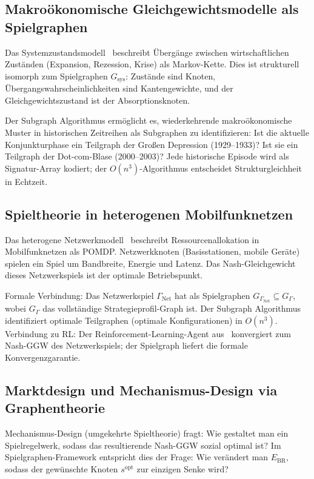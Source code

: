 ﻿\documentclass[a4paper,12pt]{article}
\theoremstyle{definition}
\begin{document}
\subsection{Makro\"okonomische Gleichgewichtsmodelle als Spielgraphen}

Das Systemzustandsmodell~\cite{epp2026sysstate} beschreibt \"Uberg\"ange zwischen
wirtschaftlichen Zust\"anden (Expansion, Rezession, Krise) als Markov-Kette.
Dies ist strukturell isomorph zum Spielgraphen $G_{\mathrm{sys}}$:
Zust\"ande sind Knoten, \"Ubergangswahrscheinlichkeiten sind Kantengewichte,
und der Gleichgewichtszustand ist der Absorptionsknoten.

Der Subgraph Algorithmus erm\"oglicht es, wiederkehrende makro\"okonomische
Muster in historischen Zeitreihen als Subgraphen zu identifizieren:
Ist die aktuelle Konjunkturphase ein Teilgraph der Gro{\ss}en Depression
(1929--1933)? Ist sie ein Teilgraph der Dot-com-Blase (2000--2003)?
Jede historische Episode wird als Signatur-Array kodiert;
der $O(n^3)$-Algorithmus entscheidet Strukturgleichheit in Echtzeit.

\subsection{Spieltheorie in heterogenen Mobilfunknetzen}

Das heterogene Netzwerkmodell~\cite{epp2026hetnet} beschreibt Ressourcenallokation
in Mobilfunknetzen als POMDP. Netzwerkknoten (Basisstationen, mobile Ger\"ate)
spielen ein Spiel um Bandbreite, Energie und Latenz.
Das Nash-Gleichgewicht dieses Netzwerkspiels ist der optimale Betriebspunkt.

Formale Verbindung: Das Netzwerkspiel $\Gamma_{\mathrm{Net}}$ hat als Spielgraphen
$G_{\Gamma_{\mathrm{Net}}} \subseteq G_\Gamma$, wobei $G_\Gamma$ das vollst\"andige
Strategieprofil-Graph ist. Der Subgraph Algorithmus~\cite{epp2026subgraph}
identifiziert optimale Teilgraphen (optimale Konfigurationen) in $O(n^3)$.
Verbindung zu RL: Der Reinforcement-Learning-Agent aus~\cite{epp2026hetnet}
konvergiert zum Nash-GGW des Netzwerkspiels; der Spielgraph liefert die
formale Konvergenzgarantie.

\subsection{Marktdesign und Mechanismus-Design via Graphentheorie}

Mechanismus-Design (umgekehrte Spieltheorie) fragt: Wie gestaltet man ein
Spielregelwerk, sodass das resultierende Nash-GGW sozial optimal ist?
Im Spielgraphen-Framework entspricht dies der Frage: Wie ver\"andert man
$E_{\mathrm{BR}}$, sodass der gew\"unschte Knoten $s^{\mathrm{opt}}$ zur einzigen
Senke wird?
\end{document}
